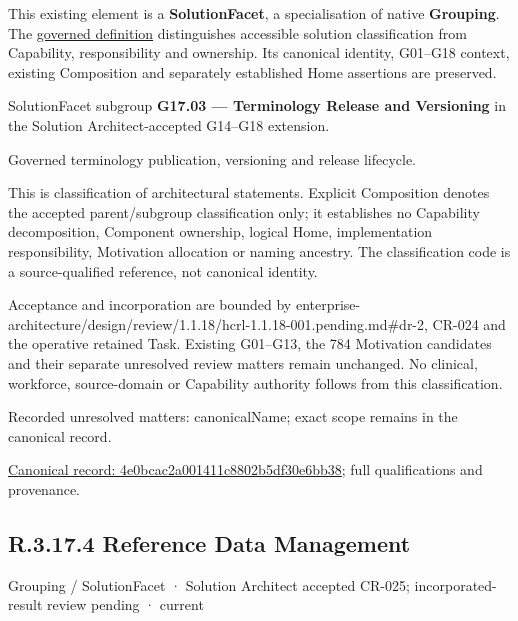 This existing element is a \textbf{SolutionFacet}, a specialisation of native
\textbf{Grouping}. The \href{\detokenize{../../../../../../../governance/continuum-representation.md#solutionfacet-classification--1119-candidate}}{governed definition}
distinguishes accessible solution classification from Capability, responsibility
and ownership. Its canonical identity, G01–G18 context, existing Composition
and separately established Home assertions are preserved.



SolutionFacet subgroup \textbf{G17.03 — Terminology Release and Versioning} in the Solution Architect-accepted G14–G18 extension.



Governed terminology publication, versioning and release lifecycle.



This is classification of architectural statements. Explicit Composition denotes the accepted parent/subgroup classification only; it establishes no Capability decomposition, Component ownership, logical Home, implementation responsibility, Motivation allocation or naming ancestry. The classification code is a source-qualified reference, not canonical identity.



Acceptance and incorporation are bounded by enterprise-architecture/design/review/1.1.18/hcrl-1.1.18-001.pending.md\#dr-2, CR-024 and the operative retained Task. Existing G01–G13, the 784 Motivation candidates and their separate unresolved review matters remain unchanged. No clinical, workforce, source-domain or Capability authority follows from this classification.


{\small Recorded unresolved matters: canonicalName; exact scope remains in the canonical record.}\par
{\footnotesize \href{../../../../../../../continuum/grouping/4e0bcac2a001411c8802b5df30e6bb38.md}{Canonical record: 4e0bcac2a001411c8802b5df30e6bb38}; full qualifications and provenance.}\par
\subsection*{R.3.17.4 Reference Data Management}
\label{navigation:R.3.17.4}

\label{element:ba0e7f67e2e7496d9df8f6617ee39ec3}
{\small Grouping / SolutionFacet · Solution Architect accepted CR-025; incorporated-result review pending · current}\par

